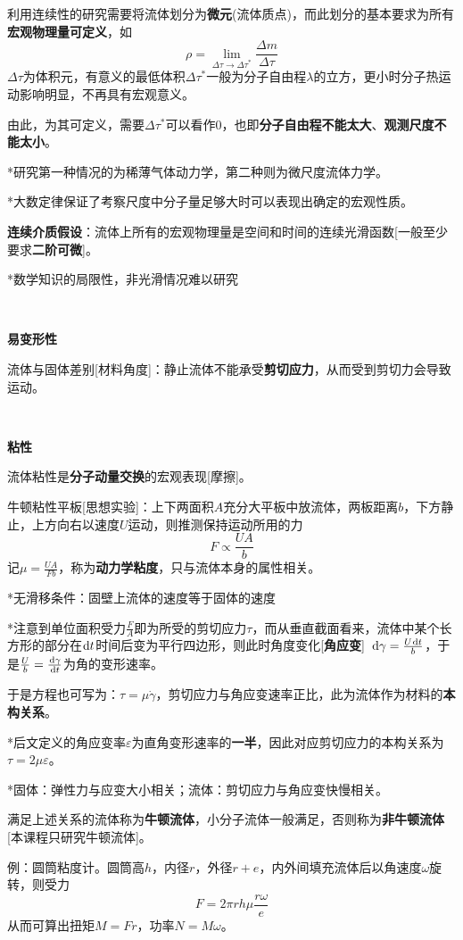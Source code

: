 \documentclass[a4paper,UTF8,fontset=windows]{ctexart}
\newcommand*{\dr}{\hspace{0.07em}\mathrm{d}}
\begin{document}
利用连续性的研究需要将流体划分为\textbf{微元}(流体质点)，而此划分的基本要求为所有\textbf{宏观物理量可定义}，如
$$\rho=\lim_{\Delta\tau\to\Delta\tau^*}\frac{\Delta m}{\Delta\tau}$$
$\Delta\tau$为体积元，有意义的最低体积$\Delta\tau^*$一般为分子自由程$\lambda$的立方，更小时分子热运动影响明显，不再具有宏观意义。

由此，为其可定义，需要$\Delta\tau^*$可以看作0，也即\textbf{分子自由程不能太大}、\textbf{观测尺度不能太小}。

*研究第一种情况的为稀薄气体动力学，第二种则为微尺度流体力学。

*大数定律保证了考察尺度中分子量足够大时可以表现出确定的宏观性质。

\textbf{连续介质假设}：流体上所有的宏观物理量是空间和时间的连续光滑函数[一般至少要求\textbf{二阶可微}]。

*数学知识的局限性，非光滑情况难以研究

\

\textbf{易变形性}

流体与固体差别[材料角度]：静止流体不能承受\textbf{剪切应力}，从而受到剪切力会导致运动。

\

\textbf{粘性}

流体粘性是\textbf{分子动量交换}的宏观表现[摩擦]。

牛顿粘性平板[思想实验]：上下两面积$A$充分大平板中放流体，两板距离$b$，下方静止，上方向右以速度$U$运动，则推测保持运动所用的力
$$F\propto\frac{UA}{b}$$
记$\mu=\frac{UA}{Fb}$，称为\textbf{动力学粘度}，只与流体本身的属性相关。

*无滑移条件：固壁上流体的速度等于固体的速度

*注意到单位面积受力$\frac{F}{A}$即为所受的剪切应力$\tau$，而从垂直截面看来，流体中某个长方形的部分在$\dr t$时间后变为平行四边形，则此时角度变化[\textbf{角应变}]\ $\dr\gamma=\frac{U\dr t}{b}$，于是$\frac{U}{b}=\frac{\dr\gamma}{\dr t}$为角的变形速率。

于是方程也可写为：$\tau=\mu\dot{\gamma}$，剪切应力与角应变速率正比，此为流体作为材料的\textbf{本构关系}。

*后文定义的角应变率$\varepsilon$为直角变形速率的\textbf{一半}，因此对应剪切应力的本构关系为$\tau=2\mu\varepsilon$。

*固体：弹性力与应变大小相关；流体：剪切应力与角应变快慢相关。

满足上述关系的流体称为\textbf{牛顿流体}，小分子流体一般满足，否则称为\textbf{非牛顿流体}[本课程只研究牛顿流体]。

例：圆筒粘度计。圆筒高$h$，内径$r$，外径$r+e$，内外间填充流体后以角速度$\omega$旋转，则受力
$$F=2\pi rh\mu\frac{r\omega}{e}$$
从而可算出扭矩$M=Fr$，功率$N=M\omega$。
\end{document}
